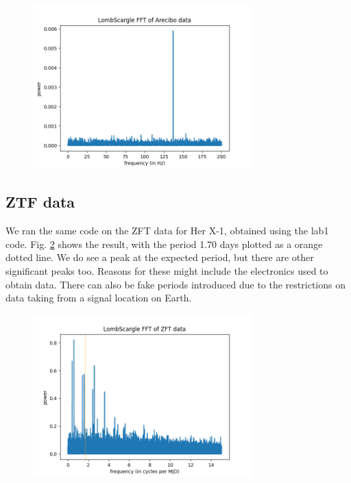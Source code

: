 \documentclass{article}
\begin{document}
\begin{figure}[h!]
\centering
\includegraphics[width=0.75\textwidth]{plots/arecibo_LombScargle.png}
\caption{\label{fig:arecibo_LombScargle}  }
\end{figure}

\subsection{ZTF data}

We ran the same code on the ZFT data for Her X-1, obtained using the lab1 code. Fig. \ref{fig:ZFT_LombScargle} shows the result, with the period 1.70 days plotted as a orange dotted line. We do see a peak at the expected period, but there are other significant peaks too. Reasons for these might include the electronics used to obtain data. There can also be fake periods introduced due to the restrictions on data taking from a signal location on Earth. 

\begin{figure}[h!]
\centering
\includegraphics[width=0.75\textwidth]{plots/ZFT_LombScargle.png}
\caption{\label{fig:ZFT_LombScargle}  }
\end{figure}
\end{document}
